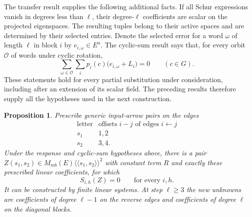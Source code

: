 \documentclass[11pt]{article}
\newtheorem{proposition}[theorem]{Proposition}
\theoremstyle{definition}
\theoremstyle{remark}
\numberwithin{equation}{section}
\begin{document}
The transfer result supplies the following additional facts.  If all Schur
expressions vanish in degrees less than $\ell$, their degree-$\ell$
coefficients are scalar on the projected eigenspaces.  The resulting tuples
belong to their active spaces and are determined by their selected entries.
Denote the selected error for a word $\omega$ of length $\ell$ in block
$i$ by $e_{i,\omega}\in E^a$.  The cyclic-sum result says that, for every
orbit $\mathcal O$ of words under cyclic rotation,
\begin{equation}
 \sum_{\omega\in\mathcal O}\sum_i
 p_i(c)\bigl(e_{i,\omega}+L_i\bigr)=0
 \qquad(c\in G).
 \label{eq:correction-cyclic-input}
\end{equation}
These statements hold for every partial substitution under consideration,
including after an extension of its scalar field.  The preceding results
therefore supply all the hypotheses used in the next construction.

\begin{proposition}
\label{prop:eleven-block-correction}
Prescribe generic input-arrow pairs on the edges
\[
 \begin{array}{c|c}
 \text{letter}&\text{offsets }i-j\text{ of edges }i\leftarrow j\\ \hline
 s_1&1,2\\
 s_2&3,4.
 \end{array}
\]
Under the response and cyclic-sum hypotheses above, there is a pair
$Z(s_1,s_2)\in M_{mb}(E)\langle\!\langle s_1,s_2\rangle\!\rangle^2$
with constant term $R$ and exactly these prescribed linear coefficients,
for which
\[
 S_{i,h}(Z)=0\qquad\text{for every }i,h.
\]
It can be constructed by finite linear systems.  At step $\ell\ge3$ the
new unknowns are coefficients of degree $\ell-1$ on the reverse edges
and coefficients of degree $\ell$ on the diagonal blocks.
\end{proposition}
\end{document}
